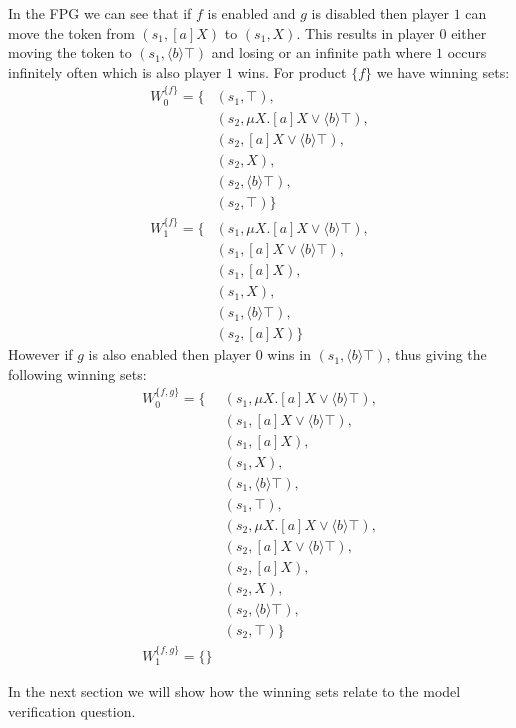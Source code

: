 In the FPG we can see that if $f$ is enabled and $g$ is disabled then player $1$ can move the token from $(s_1, [a]X)$ to $(s_1,X)$. This results in player $0$ either moving the token to $(s_1, \langle b \rangle \top)$ and losing or an infinite path where $1$ occurs infinitely often which is also player $1$ wins. For product $\{f\}$ we have winning sets:
\begin{align*}
W_0^{\{f\}} = \{
& (s_1, \top),\\
& (s_2, \mu X.[a]X \vee \langle b \rangle \top),\\
& (s_2, [a]X \vee \langle b \rangle \top),\\
& (s_2, X),\\
& (s_2, \langle b \rangle \top),\\
& (s_2, \top)
\}\\
W_1^{\{f\}} = \{& (s_1, \mu X.[a]X \vee \langle b \rangle \top),\\
& (s_1, [a]X \vee \langle b \rangle \top),\\
& (s_1, [a]X),\\
& (s_1, X),\\
& (s_1, \langle b \rangle \top ),\\
& (s_2, [a]X)\}
\end{align*}
However if $g$ is also enabled then player $0$ wins in $(s_1, \langle b \rangle \top)$, thus giving the following winning sets:
\begin{align*}
W_0^{\{f,g\}} = \{& (s_1, \mu X.[a]X \vee \langle b \rangle \top),\\
& (s_1, [a]X \vee \langle b \rangle \top),\\
& (s_1, [a]X),\\
& (s_1, X),\\
& (s_1, \langle b \rangle \top ),\\
& (s_1, \top),\\
& (s_2, \mu X.[a]X \vee \langle b \rangle \top),\\
& (s_2, [a]X \vee \langle b \rangle \top),\\
& (s_2, [a]X),\\
& (s_2, X),\\
& (s_2, \langle b \rangle \top),\\
& (s_2, \top)
\}\\
W_1^{\{f,g\}} = \{\}
\end{align*}

In the next section we will show how the winning sets relate to the model verification question.


